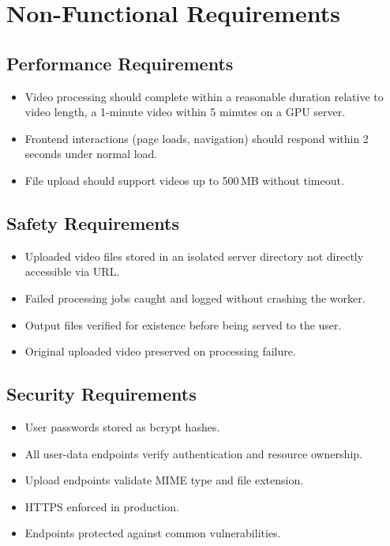 ﻿\documentclass[11pt,a4paper]{article}
\begin{document}
\section{Non-Functional Requirements}

\subsection{Performance Requirements}
\begin{itemize}[leftmargin=*]
    \item Video processing should complete within a reasonable duration relative to video length, a 1-minute video within 5 minutes on a GPU server.
    \item Frontend interactions (page loads, navigation) should respond within 2 seconds under normal load.
    \item File upload should support videos up to 500\,MB without timeout.
\end{itemize}

\subsection{Safety Requirements}
\begin{itemize}[leftmargin=*]
    \item Uploaded video files stored in an isolated server directory not directly accessible via URL.
    \item Failed processing jobs caught and logged without crashing the worker.
    \item Output files verified for existence before being served to the user.
    \item Original uploaded video preserved on processing failure.
\end{itemize}

\subsection{Security Requirements}
\begin{itemize}[leftmargin=*]
    \item User passwords stored as bcrypt hashes.
    \item All user-data endpoints verify authentication and resource ownership.
    \item Upload endpoints validate MIME type and file extension.
    \item HTTPS enforced in production.
    \item Endpoints protected against common vulnerabilities.
\end{itemize}
\end{document}
